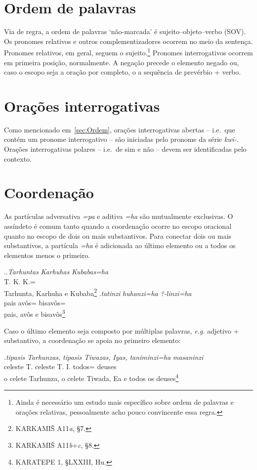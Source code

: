 \section{Ordem de palavras}\label{sec:Ordem}

Via de regra, a ordem de palavras `não-marcada' é sujeito--objeto--verbo (SOV).
Os pronomes relativos e outros complementizadores ocorrem no meio da sentença.
Pronomes relativos, em geral, seguem o sujeito.\footnote{Ainda é necessário um
	estudo mais específico sobre ordem de palavras e orações relativas,
	pessoalmente acho pouco convincente essa regra.}
Pronomes interrogativos ocorrem em primeira posição, normalmente.
A negação precede o elemento negado ou, caso o escopo seja a oração por completo,
o a sequência de prevérbio + verbo.

\section{Orações interrogativas}
Como mencionado em~\autoref{sec:Ordem}, orações interrogativas abertas -- i.e.\
que contém um pronome interrogativo -- são iniciadas pelo pronome da série
\emph{kwi-}.
Orações interrogativas polares -- i.e.\ de sim e não -- devem ser identificadas
pelo contexto.

\section{Coordenação}
As partículas adversativa \emph{=pa} e aditiva \emph{=ha} são mutualmente
exclusivas.
O assíndeto é comum tanto quando a coordenação ocorre no escopo oracional quanto
no escopo de dois ou mais substantivos.
Para conectar dois ou mais substantivos, a partícula \emph{=ha} é adicionada ao
último elemento ou a todos os elementos menos o primeiro.

\ex.\ag.\emph{Tarhuntas} \emph{Karhuhas} \emph{Kubabas=ha}\\
T. K. K.=\Conj{}\\
Tarhunta, Karhuha e Kubaba\footnote{KARKAMIŠ A11\emph{a}, §7.}
\bg.\emph{tatinzi} \emph{huhanzi=ha} \emph{{?}-linzi=ha}\\
pais avôs=\Conj{} bisavôs=\Conj{}\\
pais, avôs e bisavôs\footnote{KARKAMIŠ A11\emph{b}+\emph{c}, §8.}


\noindent Caso o último elemento seja composto por múltiplas palavras, \emph{e.g.}
adjetivo + substantivo, a coordenação se apoia no primeiro elemento:


\exg.\emph{tipasis} \emph{Tarhunzas,} \emph{tipasis} \emph{Tiwazas,} \emph{Iyas,} \emph{taniminzi=ha} \emph{masaninzi}\\
celeste T. celeste T. I. todos=\Conj{} deuses\\
o celete Tarhunza, o celete Tiwada, Ea e todos os deuses\footnote{KARATEPE 1,
	§LXXIII, Hu.}


